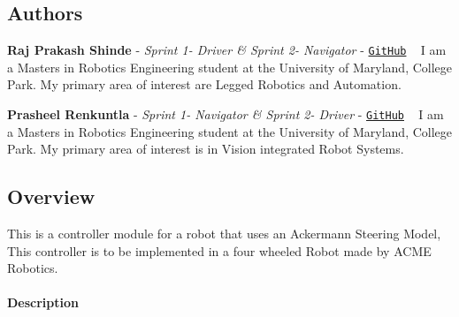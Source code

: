 \href{https://travis-ci.org/RajPShinde/Robot_Controller_Module}{\tt } \href{https://coveralls.io/github/RajPShinde/Robot_Controller_Module?branch=master}{\tt } \href{https://github.com/RajPShinde/Robot_Controller_Module/blob/master/LICENSE}{\tt } \subsection*{\href{https://github.com/RajPShinde/Robot_Controller_Module/tree/master/docs}{\tt } }

\subsection*{Authors}


\begin{DoxyItemize}
\item {\bfseries Raj Prakash Shinde} -\/ {\itshape Sprint 1-\/ Driver \& Sprint 2-\/ Navigator} -\/ \href{https://github.com/RajPShinde}{\tt Git\+Hub} ~\newline
I am a Masters in Robotics Engineering student at the University of Maryland, College Park. My primary area of interest are Legged Robotics and Automation.
\item {\bfseries Prasheel Renkuntla} -\/ {\itshape Sprint 1-\/ Navigator \& Sprint 2-\/ Driver} -\/ \href{https://github.com/Prasheel24}{\tt Git\+Hub} ~\newline
I am a Master\textquotesingle{}s in Robotics Engineering student at the University of Maryland, College Park. My primary area of interest is in Vision integrated Robot Systems.
\end{DoxyItemize}

\subsection*{Overview}

This is a controller module for a robot that uses an Ackermann Steering Model, This controller is to be implemented in a four wheeled Robot made by A\+C\+ME Robotics.

\paragraph*{Description}

